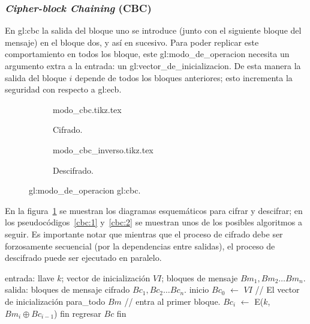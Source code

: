 %
%

\subsubsection{\textit{Cipher-block Chaining} (CBC)}
\label{sec:cbc}

En \gls{gl:cbc} la salida del bloque uno se introduce (junto con
el siguiente bloque del mensaje) en el bloque dos, y así en sucesivo.
Para poder replicar este comportamiento en todos los bloque, este
\gls{gl:modo_de_operacion} necesita un argumento extra a la entrada: un
\gls{gl:vector_de_inicializacion}. De esta manera la salida del bloque $ i $
depende de todos los bloques anteriores; esto incrementa la seguridad con
respecto a \gls{gl:ecb}.

\begin{figure}
  \centering
  \begin{subfigure}{0.45\textwidth}
    \begin{center}
      {modo_cbc.tikz.tex}
      \caption{Cifrado.}
    \end{center}
  \end{subfigure}
  \begin{subfigure}{0.45\textwidth}
    \begin{center}
      {modo_cbc_inverso.tikz.tex}
      \caption{Descifrado.}
    \end{center}
  \end{subfigure}
  \caption{\Gls{gl:modo_de_operacion} \gls{gl:cbc}.}
  \label{figura:cbc}
\end{figure}

En la figura~\ref{figura:cbc} se muestran los diagramas esquemáticos para
cifrar y descifrar; en los pseudocódigos~\ref{cbc:1} y~\ref{cbc:2} se muestran
unos de los posibles algoritmos a seguir. Es importante notar que mientras que
el proceso de cifrado debe ser forzosamente secuencial (por la dependencias
entre salidas), el proceso de descifrado puede ser ejecutado en paralelo.


\begin{pseudocodigo}[%
    caption={\Gls{gl:modo_de_operacion} \gls{gl:cbc}, cifrado.},
    label={cbc:1}%
  ]
    entrada: llave $ k $; vector de inicialización $ VI $;
             bloques de mensaje $ Bm_1, Bm_2 \dots Bm_n $.
    salida:  bloques de mensaje cifrado $ Bc_1, Bc_2 \dots Bc_n $.
    inicio
      $Bc_0$ $\gets$ $ VI $                        // El vector de inicialización
      para_todo $Bm$               // entra al primer bloque.
        $Bc_i$ $\gets$ E($k$, $Bm_i \oplus Bc_{i - 1}$)
      fin
      regresar $Bc$
    fin
\end{pseudocodigo}

